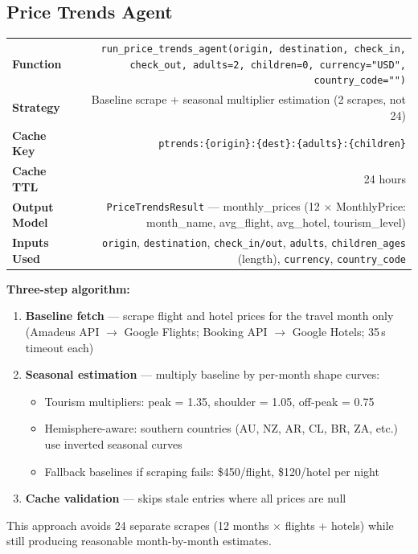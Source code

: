 \documentclass[11pt,a4paper]{article}
\begin{document}
\subsection{Price Trends Agent}
\begin{infobox}
{\small
\begin{tabularx}{\textwidth}{@{}L{3cm}R@{}}
\textbf{Function}     & \texttt{run\_price\_trends\_agent(origin, destination, check\_in, check\_out, adults=2, children=0, currency="USD", country\_code="")} \\[3pt]
\textbf{Strategy}      & Baseline scrape + seasonal multiplier estimation (2 scrapes, not 24) \\[3pt]
\textbf{Cache Key}     & \texttt{ptrends:\{origin\}:\{dest\}:\{adults\}:\{children\}} \\[3pt]
\textbf{Cache TTL}     & 24 hours \\[3pt]
\textbf{Output Model}  & \texttt{PriceTrendsResult} --- monthly\_prices (12 $\times$ MonthlyPrice: month\_name, avg\_flight, avg\_hotel, tourism\_level) \\[3pt]
\textbf{Inputs Used}   & \texttt{origin}, \texttt{destination}, \texttt{check\_in/out}, \texttt{adults}, \texttt{children\_ages} (length), \texttt{currency}, \texttt{country\_code} \\
\end{tabularx}}

\textbf{Three-step algorithm:}
\begin{enumerate}[nosep]
\item \textbf{Baseline fetch} --- scrape flight and hotel prices for the travel month only (Amadeus API $\to$ Google Flights; Booking API $\to$ Google Hotels; 35\,s timeout each)
\item \textbf{Seasonal estimation} --- multiply baseline by per-month shape curves:
    \begin{itemize}[nosep]
    \item Tourism multipliers: peak = 1.35, shoulder = 1.05, off-peak = 0.75
    \item Hemisphere-aware: southern countries (AU, NZ, AR, CL, BR, ZA, etc.) use inverted seasonal curves
    \item Fallback baselines if scraping fails: \$450/flight, \$120/hotel per night
    \end{itemize}
\item \textbf{Cache validation} --- skips stale entries where all prices are null
\end{enumerate}
This approach avoids 24 separate scrapes (12 months $\times$ flights + hotels) while still producing reasonable month-by-month estimates.
\end{infobox}
\end{document}
